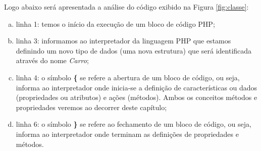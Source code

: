 \FloatBarrier 	%

Logo abaixo será apresentada a análise do código exibido na
Figura \ref{fig:classe}:

\begin{enumerate}[a)]
    \item linha 1: temos o início da execução de um bloco de código
    PHP;
    \item linha 3: informamos ao interpretador da linguagem PHP que
    estamos definindo um novo tipo de dados (uma nova estrutura) que será
    identificada através do nome \textit{Carro};
    \item linha 4: o símbolo \textbf{\{} se refere a abertura de um
    bloco de código, ou seja, informa ao interpretador onde inicia-se a definição de
    características ou dados (propriedades ou atributos) e ações (métodos).
    Ambos os conceitos métodos e propriedades veremos ao decorrer deste
    capítulo;
    \item linha 6: o símbolo \textbf{\}} se refere ao fechamento de um
    bloco de código, ou seja, informa ao interpretador onde terminam as
    definições de propriedades e métodos.
\end{enumerate}
